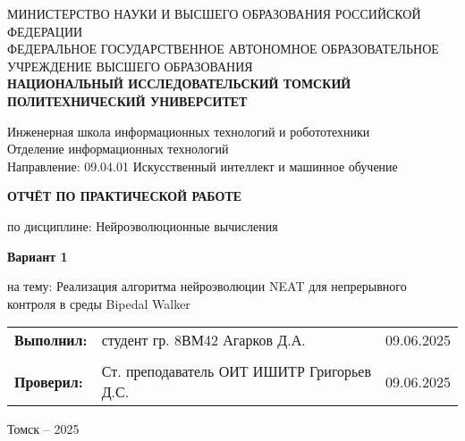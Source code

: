 \documentclass[a4paper,12pt]{article}
\begin{document}
\begin{titlepage}
	\vspace*{1cm}
	{\small
		\begin{center}
			МИНИСТЕРСТВО НАУКИ И ВЫСШЕГО ОБРАЗОВАНИЯ РОССИЙСКОЙ ФЕДЕРАЦИИ\\
			ФЕДЕРАЛЬНОЕ ГОСУДАРСТВЕННОЕ АВТОНОМНОЕ ОБРАЗОВАТЕЛЬНОЕ УЧРЕЖДЕНИЕ ВЫСШЕГО ОБРАЗОВАНИЯ\\
			\textbf{НАЦИОНАЛЬНЫЙ ИССЛЕДОВАТЕЛЬСКИЙ ТОМСКИЙ ПОЛИТЕХНИЧЕСКИЙ УНИВЕРСИТЕТ}
		\end{center}
	}
	\vspace{0.5cm}
	\begin{center}
		Инженерная школа информационных технологий и робототехники\\
		Отделение информационных технологий\\
		Направление: 09.04.01 Искусственный интеллект и машинное обучение
	\end{center}
	\vspace{1cm}
	\begin{center}
		\textbf{ОТЧЁТ ПО ПРАКТИЧЕСКОЙ РАБОТЕ}
	\end{center}
	\begin{center}
		по дисциплине: Нейроэволюционные вычисления
	\end{center}
	\vspace{0.5cm}
	\begin{center}
		\textbf{Вариант 1}
	\end{center}
	\begin{center}
		на тему: Реализация алгоритма нейроэволюции NEAT для непрерывного контроля в среды Bipedal Walker
	\end{center}
	\vspace{1cm}
	
	\begin{tabular}{p{} p{} p{}}
		\textbf{Выполнил:} & студент гр. 8ВМ42 \newline Агарков Д.А.& 09.06.2025\\
		& & \\
		\textbf{Проверил:} & Ст. преподаватель ОИТ ИШИТР \newline Григорьев Д.С. & 09.06.2025\end{tabular}
	\vfill
	\begin{center}
		Томск – 2025
	\end{center}
\end{titlepage}
\end{document}
